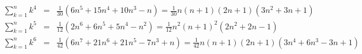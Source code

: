 \begin{eqnarray*}
	\sum_{k=1}^n k^4 &=& \frac1{30} (6n^5+15n^4+10n^3-n) = \frac1{30} n(n+1)(2n+1)(3n^2+3n+1) \\
	\sum_{k=1}^n k^5 &=& \frac1{12} (2n^6+6n^5+5n^4-n^2) = \frac1{12} n^2(n+1)^2(2n^2+2n-1) \\
	\sum_{k=1}^n k^6 &=& \frac1{42} (6n^7+21n^6+21n^5-7n^3+n) = \frac1{42} n(n+1)(2n+1)(3n^4+6n^3-3n+1)
\end{eqnarray*}
